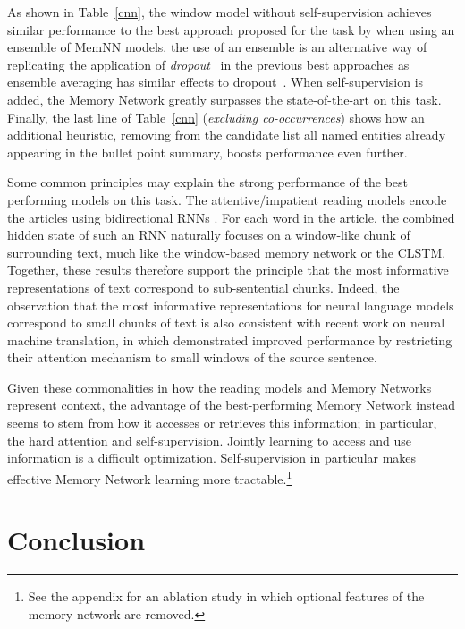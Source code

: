 As shown in Table~\ref{cnn}, the window model without self-supervision 
achieves similar
performance to the best approach proposed for the task by \cite{nips15_hermann}
when using an ensemble of MemNN models.
the use of an ensemble 
is an alternative way of replicating the application of \emph{dropout}~\citep{hinton2012improving} in the previous best
approaches \citep{nips15_hermann} as ensemble averaging has similar effects to dropout~\citep{wan2013regularization}.
When self-supervision is added, the Memory Network
greatly surpasses the state-of-the-art on this task. 
Finally, the last line of
Table~\ref{cnn} (\emph{excluding co-occurrences}) shows how an additional heuristic, removing from the candidate list all named entities
already appearing in the bullet point summary, boosts performance even further.


Some common principles may explain the strong
performance of the best performing models on this
task. The attentive/impatient reading models encode the articles using bidirectional RNNs
\citep{graves2008unconstrained}. For each word in
the article, the combined hidden state of such an RNN naturally
focuses on a window-like chunk of surrounding text, much like the window-based memory network or the CLSTM. Together, these results therefore support the principle that the most informative representations of text correspond to sub-sentential chunks. Indeed, the observation that the most informative representations
for neural language models correspond to small chunks of text is
also consistent with recent work on neural machine translation, in which
\cite{luong2015effective} demonstrated improved performance by
restricting their attention mechanism to small  windows of
the source sentence.


Given these commonalities in how the reading models and Memory
Networks represent context, the advantage of the best-performing
Memory Network instead seems to stem from how it accesses or retrieves
this information; in particular, the hard attention and
self-supervision. Jointly learning to access and use information is a
difficult optimization. Self-supervision in particular makes effective
Memory Network learning more tractable.\footnote{See the appendix for an ablation study in which optional features of the memory network are removed.} 

\section{Conclusion}

